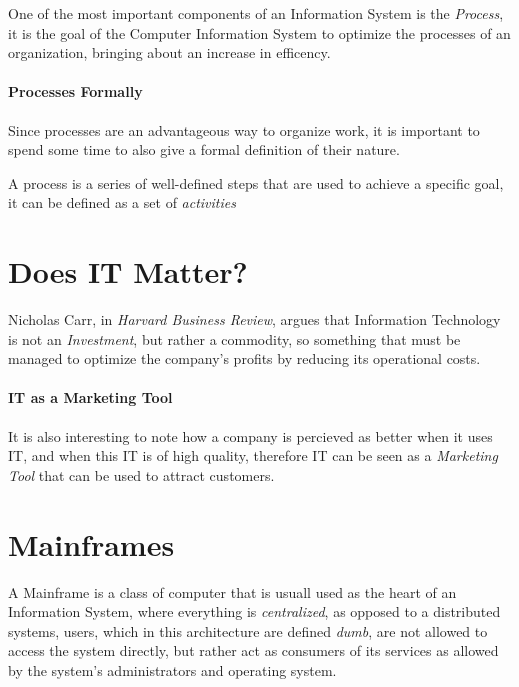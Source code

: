 \documentclass[openright, twoside, twocolumn]{report}
\begin{document}
    One of the most important components of an Information System is the \emph{Process}, it is 
    the goal of the Computer Information System to optimize the processes of an organization,
    bringing about an increase in efficency.

    \paragraph{Processes Formally} 
    Since processes are an advantageous way to organize work, it is important to spend some time to 
    also give a formal definition of their nature.

    \begin{definition}
      \label{def:proc}
      A process is a series of well-defined steps that are used to achieve a specific goal, it can 
      be defined as a set of \emph{activities}
    \end{definition}

    \section{Does IT Matter?}
    Nicholas Carr, in \emph{Harvard Business Review}, argues that Information Technology is not an \emph{Investment}, 
    but rather a commodity, so something that must be managed to optimize the company's profits by reducing its 
    operational costs.
    
    \paragraph{IT as a Marketing Tool}
    It is also interesting to note how a company is percieved as better when it uses IT, and when this IT is 
    of high quality, therefore IT can be seen as a \emph{Marketing Tool} that can be used to attract customers.
    

    \section{Mainframes}
    
    A Mainframe is a class of computer that is usuall used as the heart of an Information System, where 
    everything is \emph{centralized}, as opposed to a distributed systems, users, which in this 
    architecture are defined \emph{dumb}, are not allowed to access the system directly, but rather
    act as consumers of its services as allowed by the system's administrators and operating system.
\end{document}
